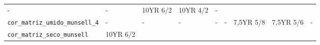 \documentclass[a4paper,dvipsnames]{tufte-book}
\begin{document}
\begin{longtable}[]{@{}lllllllll@{}}
\begin{minipage}[t]{0.07\columnwidth}
-\strut
\end{minipage} & \begin{minipage}[t]{0.07\columnwidth}\raggedright\strut
-\strut
\end{minipage} & \begin{minipage}[t]{0.07\columnwidth}\raggedright\strut
10YR 6/2\strut
\end{minipage} & \begin{minipage}[t]{0.07\columnwidth}\raggedright\strut
10YR 4/2\strut
\end{minipage} & \begin{minipage}[t]{0.06\columnwidth}\raggedright\strut
-\strut
\end{minipage}\tabularnewline
\begin{minipage}[t]{0.21\columnwidth}\raggedright\strut
\texttt{cor\_matriz\_umido\_munsell\_4}\strut
\end{minipage} & \begin{minipage}[t]{0.06\columnwidth}\raggedright\strut
-\strut
\end{minipage} & \begin{minipage}[t]{0.06\columnwidth}\raggedright\strut
-\strut
\end{minipage} & \begin{minipage}[t]{0.07\columnwidth}\raggedright\strut
-\strut
\end{minipage} & \begin{minipage}[t]{0.07\columnwidth}\raggedright\strut
-\strut
\end{minipage} & \begin{minipage}[t]{0.07\columnwidth}\raggedright\strut
-\strut
\end{minipage} & \begin{minipage}[t]{0.07\columnwidth}\raggedright\strut
7,5YR 5/8\strut
\end{minipage} & \begin{minipage}[t]{0.07\columnwidth}\raggedright\strut
7,5YR 5/6\strut
\end{minipage} & \begin{minipage}[t]{0.06\columnwidth}\raggedright\strut
-\strut
\end{minipage}\tabularnewline
\begin{minipage}[t]{0.21\columnwidth}\raggedright\strut
\texttt{cor\_matriz\_seco\_munsell}\strut
\end{minipage} & \begin{minipage}[t]{0.06\columnwidth}\raggedright\strut
10YR 6/2\strut
\end{minipage} & \begin{minipage}[t]{0.06\columnwidth}\raggedright\strut

\end{minipage}
\end{longtable}
\end{document}
